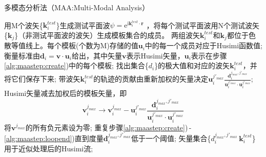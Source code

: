 \documentclass[UTF8]{ctexart}
\begin{document}
\begin{algorithm}[ht] 
    \caption{多模态分析法（MAA:Multi-Modal Analysis）}
    \label{alg:maa}
    \begin{algorithmic}[1]
        \STATE 用M个波矢\{$\mathbf{k}^{test}_{i}$\}生成测试平面波$\psi=\mathrm{e}^{\mathrm{i}\mathbf{k}_i^{test}\cdot\mathbf{r}}$ ，将每个测试平面波用N个测试波矢\{$\mathbf{k}_j$\}（非测试平面波的波矢）生成模板集合的成员。
               两组波矢$\mathbf{k}_{i}^{test}$和$\mathbf{k}_{j}$都位于色散等值线上。每个模板(个数为M)存储的值$\mathbf{u}_i$中的每一个成员对应于Husimi函数值;
        \label{alg:maastep:create}
        \STATE 衡量标准由$\mathbf{d}_i=\mathbf{v}\cdot\mathbf{u}_i$给出，其中矢量$\mathbf{v}$表示Husimi矢量，$\mathbf{u}_i$表示在步骤\ref{alg:maastep:create})中的每个模板;
        \STATE 找出集合\{$d_i$\}的极大值和对应的波矢$\mathbf{k}^{test}_i$，并将它们保存下来;
        \STATE 带波矢$\mathbf{k}^{test}_{i}$的轨迹的贡献由重新加权的矢量决定$\mathbf{u}_{i}^{j'_{max}}\frac{\mathbf{d}_{i}^{j_{max},j'_{max}}}{\mathbf{u}_{i}^{j'_{max}}\cdot\mathbf{u}_{i}^{j'_{max}}}$;
        \STATE Husimi矢量减去加权后的模板矢量，即$$\mathbf{v}^{j_{max}}_{i}\rightarrow\mathbf{v}^{j_{max}}_{i}-\mathbf{u}^{j'_{max}}_{i}\frac{\mathbf{d}^{j_{max},j'_{max}}_{i}}{\mathbf{u}_{i}^{j'_{max}}\cdot\mathbf{u}_{i}^{j'_{max}}}$$
        \STATE 将$\mathbf{v}^{j_{max}}$的所有负元素设为零;
        \label {alg:maastep:loopend}
        \STATE 重复步骤\ref{alg:maastep:create})\,-\,\ref{alg:maastep:loopend})直到度量$\mathbf{d}_{i}^{j_{max},j'_{max}}$低于一个阈值;
        \STATE 矢量集合\{$d_{i}^{j_{max},j'_{max}}\,\mathbf{k}^{test}_i$\}用于近似处理后的Husimi流;
    \end{algorithmic}
\end{algorithm}
\end{document}
